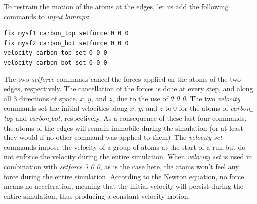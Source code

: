 \documentclass[9pt,tutorial]{livecoms}
\begin{document}
To restrain the motion of the atoms at the edges, let us add the following commands to \textit{input.lammps}:
{\normalsize \begin{verbatim}
fix mysf1 carbon_top setforce 0 0 0
fix mysf2 carbon_bot setforce 0 0 0
velocity carbon_top set 0 0 0
velocity carbon_bot set 0 0 0
\end{verbatim}}
The two \textit{setforce} commands cancel the forces applied on the atoms of the two edges, respectively. The cancellation of the forces is done at every step, and along all 3 directions of space, $x$, $y$, and $z$, due to the use of \textit{0 0 0}. The two \textit{velocity} commands set the initial velocities along $x$, $y$, and $z$ to 0 for the atoms of \textit{carbon$\_$top} and \textit{carbon$\_$bot}, respectively. As a consequence of these last four commands, the atoms of the edges will remain immobile during the simulation (or at least they would if no other command was applied to them). The \textit{velocity set} commands impose the velocity of a group of atoms at the start of a run but do not enforce the velocity during the entire simulation. When \textit{velocity set} is used in combination with \textit{setforce 0 0 0}, as is the case here, the atoms won't feel any force during the entire simulation. According to the Newton equation, no force means no acceleration, meaning that the initial velocity will persist during the entire simulation, thus producing a constant velocity motion.
\end{document}
